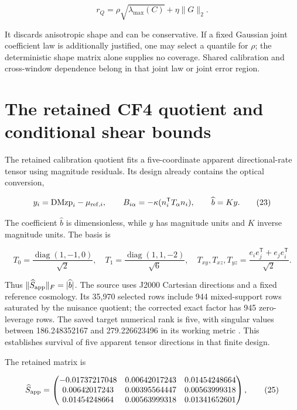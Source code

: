\documentclass[aps,prd,reprint,onecolumn,11pt,nofootinbib,notitlepage]{revtex4-2}
\begin{document}
\begin{equation}
 r_Q=\rho\sqrt{\lambda_{\max}(C)}+\eta\|G\|_2.\tag{22}
\end{equation}

It discards anisotropic shape and can be conservative. If a fixed Gaussian joint coefficient law is additionally justified, one may select a quantile for \(\rho\); the deterministic shape matrix alone supplies no coverage. Shared calibration and cross-window dependence belong in that joint law or joint error region.

\section{The retained CF4 quotient and conditional shear bounds}

The retained calibration quotient fits a five-coordinate apparent directional-rate tensor using magnitude residuals. Its design already contains the optical conversion,

\begin{equation}
 y_i=\mathrm{DMzp}_i-\mu_{{\rm ref},i},\qquad
 B_{i\alpha}=-\kappa(n_i^{\mathsf T}T_\alpha n_i),\qquad
 \widehat b=Ky .\tag{23}
\end{equation}

The coefficient \(\widehat b\) is dimensionless, while \(y\) has magnitude units and \(K\) inverse magnitude units. The basis is

\begin{equation}
 T_0=\frac{\operatorname{diag}(1,-1,0)}{\sqrt2},\quad
 T_1=\frac{\operatorname{diag}(1,1,-2)}{\sqrt6},\quad
 T_{xy},T_{xz},T_{yz}=\frac{e_ie_j^{\mathsf T}+e_je_i^{\mathsf T}}{\sqrt2} .\tag{24}
\end{equation}

Thus \(\|\widehat S_{\rm app}\|_F=|\widehat b|\). The source uses J2000 Cartesian directions and a fixed reference cosmology. Its 35,970 selected rows include 944 mixed-support rows saturated by the nuisance quotient; the corrected exact factor has 945 zero-leverage rows. The saved target numerical rank is five, with singular values between 186.248352167 and 279.226623496 in its working metric \cite{CF4Retained}. This establishes survival of five apparent tensor directions in that finite design.

The retained matrix is

\begin{equation}
 \widehat S_{\rm app}=\begin{pmatrix}
 -0.01737217048&0.00642017243&0.01454248664\\
 0.00642017243&0.00395564447&0.00563999318\\
 0.01454248664&0.00563999318&0.01341652601
 \end{pmatrix},\tag{25}
\end{equation}
\end{document}
